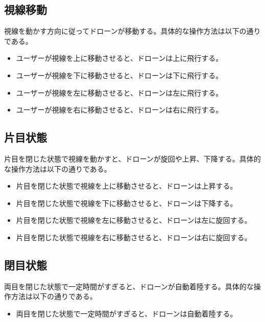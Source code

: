\documentclass[a4paper, 12pt]{article}
\begin{document}
\subsection{視線移動}
視線を動かす方向に従ってドローンが移動する。具体的な操作方法は以下の通りである。
\begin{itemize}
    \item ユーザーが視線を上に移動させると、ドローンは上に飛行する。
    \item ユーザーが視線を下に移動させると、ドローンは下に飛行する。
    \item ユーザーが視線を左に移動させると、ドローンは左に飛行する。
    \item ユーザーが視線を右に移動させると、ドローンは右に飛行する。
\end{itemize}

\subsection{片目状態}
片目を閉じた状態で視線を動かすと、ドローンが旋回や上昇、下降する。具体的な操作方法は以下の通りである。
\begin{itemize}
    \item 片目を閉じた状態で視線を上に移動させると、ドローンは上昇する。
    \item 片目を閉じた状態で視線を下に移動させると、ドローンは下降する。
    \item 片目を閉じた状態で視線を左に移動させると、ドローンは左に旋回する。
    \item 片目を閉じた状態で視線を右に移動させると、ドローンは右に旋回する。
\end{itemize}

\subsection{閉目状態}
両目を閉じた状態で一定時間がすぎると、ドローンが自動着陸する。具体的な操作方法は以下の通りである。
\begin{itemize}
    \item 両目を閉じた状態で一定時間がすぎると、ドローンは自動着陸する。
\end{itemize}

% 
% 
\end{document}
